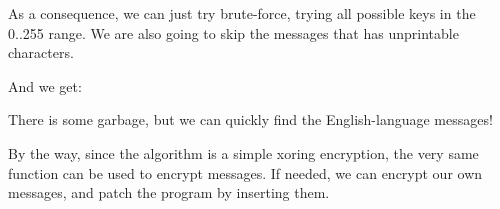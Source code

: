As a consequence, we can just try brute-force, trying all possible keys in the 0..255 range.
We are also going to skip 
the messages that has unprintable characters.



And we get:



There 
is some garbage, but we can quickly find the English-language messages!

By the way, since the algorithm is a simple xoring encryption, the very same function can be used
to encrypt messages.
If needed, we can encrypt our own messages, and patch the program by inserting them.

